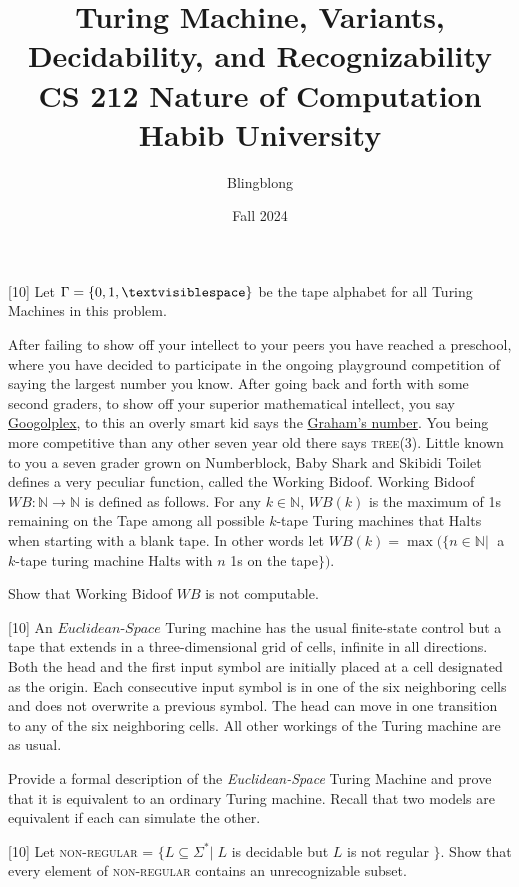 \documentclass[addpoints]{exam}
\title{Turing Machine, Variants, Decidability, and Recognizability\\ \vspace{0.5cm} \Large CS 212 Nature of Computation\\Habib University}
\author{Blingblong} %
\date{Fall 2024}
\newcommand{\blank}{\textvisiblespace}
\begin{document}
\maketitle

\begin{questions}

    \titledquestion{} [10] Let $\Gamma = \{0, 1, \blank\}$ be the tape alphabet for all Turing Machines in this problem. 
    
    After failing to show off your intellect to your peers you have reached a preschool, where you have decided to participate in the ongoing playground competition of saying the largest number you know. After going back and forth with some second graders, to show off your superior mathematical intellect, you say \href{https://en.wikipedia.org/wiki/Googolplex}{Googolplex}, to this an overly smart kid says the \href{https://en.wikipedia.org/wiki/Graham%27s_number}{Graham's number}. You being more competitive than any other seven year old there says \textsc{tree}(3). Little known to you a seven grader grown on Numberblock, Baby Shark and Skibidi Toilet defines a very peculiar function, called the Working Bidoof. 
    Working Bidoof $WB : \mathbb{N} \to \mathbb{N}$ is defined as follows. For any $k \in \mathbb{N}$, $WB(k)$ is the maximum of 1s remaining on the Tape among all possible $k$-tape Turing machines that Halts when starting with a blank tape. In other words let $WB(k) = \max(\{n \in \mathbb{N}|\;$ a $k$-tape turing machine Halts with $n$ 1s on the tape$\})$. 

    Show that Working Bidoof $WB$ is not computable.
    
    \begin{solution}
    \end{solution}
    
    \titledquestion{} [10] An $\textit{Euclidean-Space}$ Turing machine has the usual finite-state control but a tape that extends in a three-dimensional grid of cells, infinite in all directions. Both the head and the first input symbol are initially placed at a cell designated as the origin. Each consecutive input symbol is in one of the six neighboring cells and does not overwrite a previous symbol. The head can move in one transition to any of the six neighboring cells. All other workings of the Turing machine are as usual.
    
    Provide a formal description of the \textit{Euclidean-Space} Turing Machine and prove that it is equivalent to an ordinary Turing machine. Recall that two models are equivalent if each can simulate the other.
    
    \begin{solution}
    \end{solution}
      
    \titledquestion{} [10] Let \textsc{non-regular} = $\{L \subseteq \Sigma^*|\; L$ is decidable but $L$ is not regular $\}$. 
    Show that every element of \textsc{non-regular} contains an unrecognizable subset.
    \begin{solution}
    \end{solution}
    \end{questions}
\end{document}
